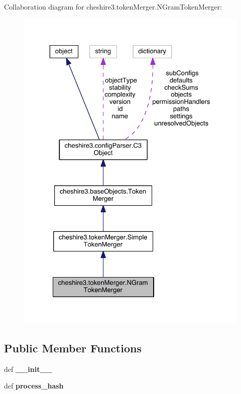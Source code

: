 Collaboration diagram for cheshire3.\-token\-Merger.\-N\-Gram\-Token\-Merger\-:
\nopagebreak
\begin{figure}[H]
\begin{center}
\leavevmode
\includegraphics[width=325pt]{classcheshire3_1_1token_merger_1_1_n_gram_token_merger__coll__graph}
\end{center}
\end{figure}
\subsection*{Public Member Functions}
\begin{DoxyCompactItemize}
\item 
\hypertarget{classcheshire3_1_1token_merger_1_1_n_gram_token_merger_a10b48b06455acbb4b9726b686b9c2d8e}{def {\bfseries \-\_\-\-\_\-init\-\_\-\-\_\-}}\label{classcheshire3_1_1token_merger_1_1_n_gram_token_merger_a10b48b06455acbb4b9726b686b9c2d8e}

\item 
\hypertarget{classcheshire3_1_1token_merger_1_1_n_gram_token_merger_a2b7b661820040174361aca36da1deb65}{def {\bfseries process\-\_\-hash}}\label{classcheshire3_1_1token_merger_1_1_n_gram_token_merger_a2b7b661820040174361aca36da1deb65}

\end{DoxyCompactItemize}
